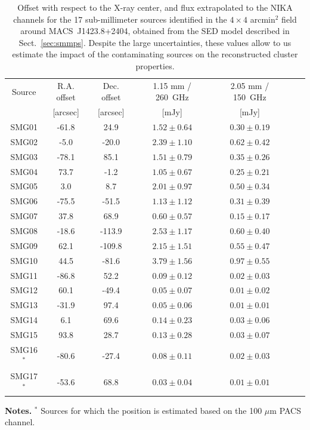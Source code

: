 \documentclass[traditabstract]{aa}
\begin{document}
\begin{table}[h]
\caption{\footnotesize Offset with respect to the X-ray center, and flux extrapolated to the NIKA channels for the 17 sub-millimeter sources identified in the $4 \times 4$ arcmin$^2$ field around \mbox{MACS~J1423.8+2404}, obtained from the SED model described in Sect.~\ref{sec:smmps}. Despite the large uncertainties, these values allow to us estimate the impact of the contaminating sources on the reconstructed cluster properties.}
\begin{center}
\begin{tabular}{ccccccc}
\hline
\hline
Source &  R.A. offset & Dec. offset & 1.15 mm / 260~GHz & 2.05 mm / 150~GHz\\
 &  [arcsec] & [arcsec] & [mJy] & [mJy] \\
\hline
SMG01 &    -61.8 &     24.9 & $    1.52 \pm     0.64$ & $    0.30 \pm     0.19$ \\
SMG02 &     -5.0 &    -20.0 & $    2.39 \pm     1.10$ & $    0.62 \pm     0.42$ \\
SMG03 &    -78.1 &     85.1 & $    1.51 \pm     0.79$ & $    0.35 \pm     0.26$ \\
SMG04 &     73.7 &     -1.2 & $    1.05 \pm     0.67$ & $    0.25 \pm     0.21$ \\
SMG05 &      3.0 &      8.7 & $    2.01 \pm     0.97$ & $    0.50 \pm     0.34$ \\
SMG06 &    -75.5 &    -51.5 & $    1.13 \pm     1.12$ & $    0.31 \pm     0.39$ \\
SMG07 &     37.8 &     68.9 & $    0.60 \pm     0.57$ & $    0.15 \pm     0.17$ \\
SMG08 &    -18.6 &   -113.9 & $    2.53 \pm     1.17$ & $    0.60 \pm     0.40$ \\
SMG09 &     62.1 &   -109.8 & $    2.15 \pm     1.51$ & $    0.55 \pm     0.47$ \\
SMG10 &     44.5 &    -81.6 & $    3.79 \pm     1.56$ & $    0.97 \pm     0.55$ \\
SMG11 &    -86.8 &     52.2 & $    0.09 \pm     0.12$ & $    0.02 \pm     0.03$ \\
SMG12 &     60.1 &    -49.4 & $    0.05 \pm     0.07$ & $    0.01 \pm     0.02$ \\
SMG13 &    -31.9 &     97.4 & $    0.05 \pm     0.06$ & $    0.01 \pm     0.01$ \\
SMG14 &      6.1 &     69.6 & $    0.14 \pm     0.23$ & $    0.03 \pm     0.06$ \\
SMG15 &     93.8 &     28.7 & $    0.13 \pm     0.28$ & $    0.03 \pm     0.07$ \\
SMG16$^*$ &    -80.6 &    -27.4 & $    0.08 \pm     0.11$ & $    0.02 \pm     0.03$ \\
SMG17$^*$ &    -53.6 &     68.8 & $    0.03 \pm     0.04$ & $    0.01 \pm     0.01$ \\
\hline
\end{tabular}
\end{center}
{\small {\bf Notes.} $^*$ Sources for which the position is estimated based on the 100 $\mu$m PACS channel.}
\label{tab:IR_ps2}
\end{table}
\end{document}
